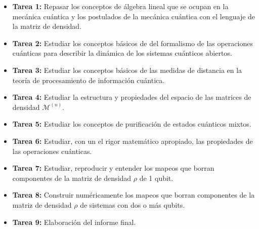 \documentclass[11pt, spanish, letterpage]{article} %
\begin{document}
\begin{itemize}
	\item \textbf{Tarea 1:} Repasar los conceptos de álgebra lineal que se ocupan en la mecánica cuántica y los postulados de la mecánica cuántica con el lenguaje de la matriz de densidad.
	\item \textbf{Tarea 2:} Estudiar los conceptos básicos de del formalismo de las operaciones cuánticas para describir la dinámica de los sistemas cuánticos abiertos.
	\item \textbf{Tarea 3:} Estudiar los conceptos básicos de las medidas de distancia en la teoría de procesamiento de información cuántica. 
	\item \textbf{Tarea 4:} Estudiar la estructura y propiedades del espacio de las matrices de densidad $\mathcal{M}^{(n)}$.
	\item \textbf{Tarea 5:} Estudiar los conceptos de purificación de estados cuánticos mixtos.
	\item \textbf{Tarea 6:} Estudiar, con un el rigor matemático apropiado, las propiedades de las operaciones cuánticas. 
	\item \textbf{Tarea 7:} Estudiar, reproducir y entender los mapeos que borran componentes de la matriz de densidad $\rho$ de 1 qubit.
	\item \textbf{Tarea 8:} Construir numéricamente los mapeos que borran componentes de la matriz de densidad $\rho$ de sistemas con dos o más qubits.
	\item \textbf{Tarea 9:} Elaboración del informe final. 
\end{itemize}


\end{document}
